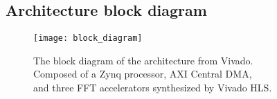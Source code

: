 \newpage

\appendix

\begin{landscape}
\appendixpage
\section{Architecture block diagram}
\label{app:block_diagram}
\begin{figure}[!th]
\centering
\texttt{[image: block\_diagram]}
\caption{The block diagram of the architecture from Vivado.\\Composed of a Zynq processor, AXI Central DMA,\\and three FFT accelerators synthesized by Vivado HLS.}
\end{figure}

\end{landscape}
